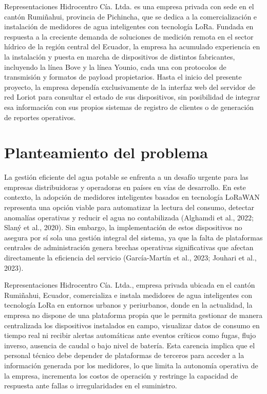 \documentclass[12pt,a4paper,oneside]{report}
\begin{document}
Representaciones Hidrocentro Cía. Ltda. es una empresa privada con sede en el cantón Rumiñahui, provincia de Pichincha, que se dedica a la comercialización e instalación de medidores de agua inteligentes con tecnología LoRa. Fundada en respuesta a la creciente demanda de soluciones de medición remota en el sector hídrico de la región central del Ecuador, la empresa ha acumulado experiencia en la instalación y puesta en marcha de dispositivos de distintos fabricantes, incluyendo la línea Bove y la línea Younio, cada una con protocolos de transmisión y formatos de payload propietarios. Hasta el inicio del presente proyecto, la empresa dependía exclusivamente de la interfaz web del servidor de red Loriot para consultar el estado de sus dispositivos, sin posibilidad de integrar esa información con sus propios sistemas de registro de clientes o de generación de reportes operativos.


\section{Planteamiento del problema}\label{planteamiento-del-problema}

La gestión eficiente del agua potable se enfrenta a un desafío urgente para las empresas distribuidoras y operadoras en países en vías de desarrollo. En este contexto, la adopción de medidores inteligentes basados en tecnología LoRaWAN representa una opción viable para automatizar la lectura del consumo, detectar anomalías operativas y reducir el agua no contabilizada (Alghamdi et al., 2022; Slaný et al., 2020). Sin embargo, la implementación de estos dispositivos no asegura por sí sola una gestión integral del sistema, ya que la falta de plataformas centrales de administración genera brechas operativas significativas que afectan directamente la eficiencia del servicio (García-Martín et al., 2023; Jouhari et al., 2023).

Representaciones Hidrocentro Cía. Ltda., empresa privada ubicada en el cantón Rumiñahui, Ecuador, comercializa e instala medidores de agua inteligentes con tecnología LoRa en entornos urbanos y periurbanos, donde en la actualidad, la empresa no dispone de una plataforma propia que le permita gestionar de manera centralizada los dispositivos instalados en campo, visualizar datos de consumo en tiempo real ni recibir alertas automáticas ante eventos críticos como fugas, flujo inverso, ausencia de caudal o bajo nivel de batería. Esta carencia implica que el personal técnico debe depender de plataformas de terceros para acceder a la información generada por los medidores, lo que limita la autonomía operativa de la empresa, incrementa los costos de operación y restringe la capacidad de respuesta ante fallas o irregularidades en el suministro.
\end{document}
